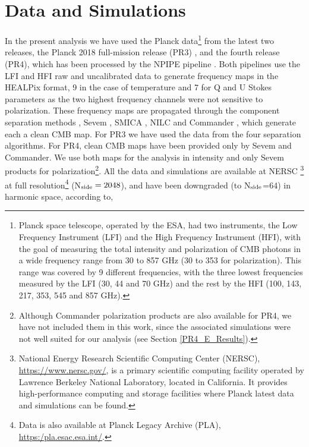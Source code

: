 \section{Data and Simulations}\label{DatSim}

In the present analysis we have used the Planck data\footnote{Planck space telescope, operated by the ESA, had two instruments, the Low Frequency Instrument (LFI) and the High Frequency Instrument (HFI), with the goal of measuring the total intensity and polarization of CMB photons in a wide frequency range from 30 to 857 GHz (30 to 353 for polarization). This range was 
covered by 9 different frequencies, with the three lowest frequencies measured by the LFI (30, 44 and 70 GHz) and the rest by the HFI (100, 143, 217, 353, 545 and 857 GHz).} from the latest two releases, the Planck 2018 full-mission release (PR3) \cite{Planck:2018nkj}, and the fourth release (PR4), which has been processed by the NPIPE pipeline \cite{Planck:2020olo}. Both pipelines use the LFI and HFI raw and uncalibrated data
to generate frequency maps in the HEALPix \cite{Gorski:2004by} format, 9 in the case of temperature and 7 for Q and U Stokes parameters as the two highest frequency channels were not sensitive to polarization. These frequency maps are propagated through the component separation methods \cite{Planck:2018yye}, Sevem \cite{2012MNRAS.420.2162F}, SMICA \cite{2008arXiv0803.1814C}, NILC \cite{10.1111/j.1365-2966.2011.19770.x} and Commander \cite{2008ApJ...676...10E}, which generate each a clean CMB map. For PR3 we have used the data from the four separation algorithms. For PR4, clean CMB maps have been provided only by Sevem and Commander. We use both maps for the analysis in intensity and only Sevem products for polarization\footnote{Although Commander polarization products are also available for PR4, 
we have not included them in this work, since the associated simulations were not well suited for our analysis (see Section \ref{PR4_E_Results}).}. All the data and simulations are available at NERSC \footnote{National Energy Research Scientific Computing Center (NERSC), \url{https://www.nersc.gov/}, is a primary scientific computing facility operated by Lawrence Berkeley National Laboratory, located in California. It provides high-performance computing and storage facilities where Planck latest data and simulations can be found.} at full resolution\footnote{Data is also available at Planck Legacy Archive (PLA), \url{https:/pla.esac.esa.int/}.}  (N$_{\rm side} = 2048$), and have been downgraded (to N$_{\rm side}$=64) in harmonic space, according to, 
